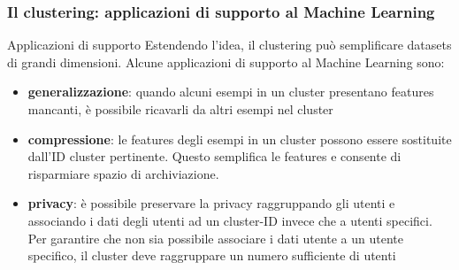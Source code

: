\begin{frame}
	
	\frametitle{Il clustering: applicazioni di supporto al Machine Learning}
	
	\begin{block}{Applicazioni di supporto}
		Estendendo l'idea, il clustering può semplificare datasets di grandi dimensioni.
		Alcune applicazioni di supporto al Machine Learning sono:
		\begin{itemize}
			\item \textbf{generalizzazione}: quando alcuni esempi in un cluster presentano features mancanti, è possibile ricavarli da altri esempi nel cluster
			\item \textbf{compressione}: le features degli esempi in un cluster possono essere sostituite dall'ID cluster pertinente. Questo semplifica le features e consente di risparmiare spazio di archiviazione.
			\item \textbf{privacy}: è possibile preservare la privacy raggruppando gli utenti e associando i dati degli utenti ad un cluster-ID invece che a utenti specifici. Per garantire che non sia possibile associare i dati utente a un utente specifico, il cluster deve raggruppare un numero sufficiente di utenti
		\end{itemize}
	\end{block}
	
\end{frame}
